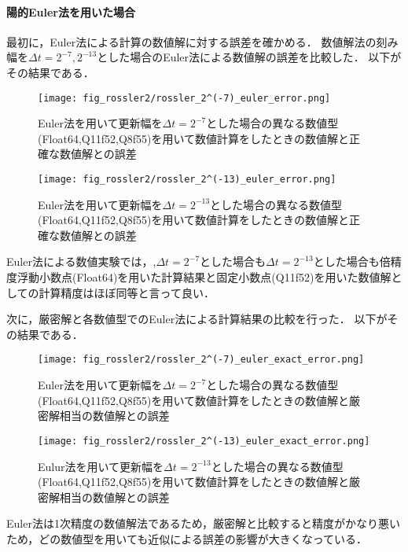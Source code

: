 \paragraph*{陽的Euler法を用いた場合}
最初に，Euler法による計算の数値解に対する誤差を確かめる．
数値解法の刻み幅を$\Delta t = 2^{-7},2^{-13}$とした場合のEuler法による数値解の誤差を比較した．
以下がその結果である．
\begin{figure}[H]
    \centering
    \begin{minipage}[b]{0.49\columnwidth}
        \centering
        \texttt{[image: fig\_rossler2/rossler\_2^(-7)\_euler\_error.png]}
        \caption{Euler法を用いて更新幅を$\Delta t = 2^{-7}$とした場合の異なる数値型(Float64,Q11f52,Q8f55)を用いて数値計算をしたときの数値解と正確な数値解との誤差}
        \label{fig:rossler_2^(-7)_euler_error}
    \end{minipage}
    \begin{minipage}[b]{0.49\columnwidth}
        \centering
        \texttt{[image: fig\_rossler2/rossler\_2^(-13)\_euler\_error.png]}
        \caption{Euler法を用いて更新幅を$\Delta t =  2^{-13}$とした場合の異なる数値型(Float64,Q11f52,Q8f55)を用いて数値計算をしたときの数値解と正確な数値解との誤差}
        \label{fig:rossler_2^(-13)_euler_error}
    \end{minipage}
\end{figure} 
Euler法による数値実験では，,$\Delta t = 2^{-7}$とした場合も$\Delta t =  2^{-13}$とした場合も倍精度浮動小数点(Float64)を用いた計算結果と固定小数点(Q11f52)を用いた数値解としての計算精度はほぼ同等と言って良い．


次に，厳密解と各数値型でのEuler法による計算結果の比較を行った．
以下がその結果である．\\
\begin{figure}[H]
    \centering
    \begin{minipage}[b]{0.49\columnwidth}
        \centering
        \texttt{[image: fig\_rossler2/rossler\_2^(-7)\_euler\_exact\_error.png]}
        \caption{Euler法を用いて更新幅を$\Delta t = 2^{-7}$とした場合の異なる数値型(Float64,Q11f52,Q8f55)を用いて数値計算をしたときの数値解と厳密解相当の数値解との誤差}
        \label{fig:rossler_2^(-7)_eluer_exact_error}
    \end{minipage}
    \begin{minipage}[b]{0.49\columnwidth}
        \centering
        \texttt{[image: fig\_rossler2/rossler\_2^(-13)\_euler\_exact\_error.png]}
        \caption{Eulur法を用いて更新幅を$\Delta t =  2^{-13}$とした場合の異なる数値型(Float64,Q11f52,Q8f55)を用いて数値計算をしたときの数値解と厳密解相当の数値解との誤差}
        \label{fig:rossler_2^(-13)_euler_exact_error}
    \end{minipage}
\end{figure}
Euler法は1次精度の数値解法であるため，厳密解と比較すると精度がかなり悪いため，どの数値型を用いても近似による誤差の影響が大きくなっている．

